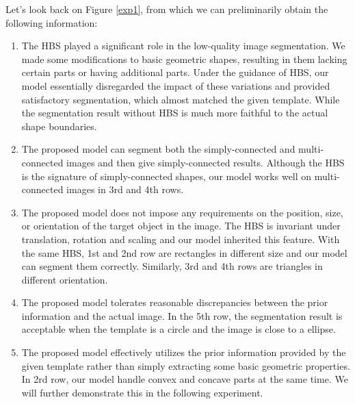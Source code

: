 \documentclass[review,onefignum,onetabnum]{siamonline190516}
\begin{document}
Let's look back on Figure \ref{exp1}, from which we can preliminarily obtain the following information:
\begin{enumerate}
    \item The HBS played a significant role in the low-quality image segmentation. We made some modifications to basic geometric shapes, resulting in them lacking certain parts or having additional parts. Under the guidance of HBS, our model essentially disregarded the impact of these variations and provided satisfactory segmentation, which almost matched the given template. While the segmentation result without HBS is much more faithful to the actual shape boundaries.
    \item The proposed model can segment both the simply-connected and multi-connected images and then give simply-connected results. Although the HBS is the signature of simply-connected shapes, our model works well on multi-connected images in 3rd and 4th rows.
    \item The proposed model does not impose any requirements on the position, size, or orientation of the target object in the image. The HBS is invariant under translation, rotation and scaling and our model inherited this feature. With the same HBS, 1st and 2nd row are rectangles in different size and our model can segment them correctly. Similarly, 3rd and 4th rows are triangles in different orientation.
    \item The proposed model tolerates reasonable discrepancies between the prior information and the actual image. In the 5th row, the segmentation result is acceptable when the template is a circle and the image is close to a ellipse.
    \item The proposed model effectively utilizes the prior information provided by the given template rather than simply extracting some basic geometric properties. In 2rd row, our model handle convex and concave parts at the same time. We will further demonstrate this in the following experiment.
\end{enumerate}
\end{document}
